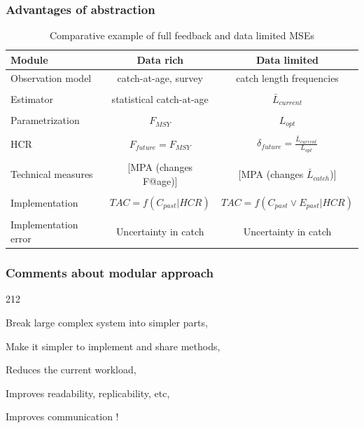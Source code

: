\documentclass{beamer}
\begin{document}
\begin{frame}
\frametitle{Advantages of abstraction}

\footnotesize

\begin{table}
	\begin{tabular}{l|c|c}
		\hline 
		Module	& Data rich & Data limited \\ 
		\hline 
		\hline 
		Observation model	&  catch-at-age, survey & catch length frequencies \\ 
    & & \\
		Estimator	& statistical catch-at-age &  $\bar{L}_{current}$ \\ 
    & & \\
		Parametrization	& $F_{MSY}$ &  $L_{opt}$ \\ 
    & & \\
		HCR	& $F_{future}=F_{MSY}$ & $\delta_{future}=\frac{\bar{L}_{current}}{L_{opt}}$ \\ 
    & & \\
		Technical measures	& [MPA (changes F@age)] & [MPA (changes $\bar{L}_{catch}$)] \\ 
    & & \\
		Implementation	& $TAC=f(C_{past}|HCR)$ & $TAC=f(C_{past} \lor E_{past}|HCR)$ \\ 
    & & \\
		Implementation error	& Uncertainty in catch & Uncertainty in catch \\ 
		\hline 
	\end{tabular} 
	
	\caption{Comparative example of full feedback and data limited MSEs}
\end{table}

\end{frame}

\begin{frame}
\frametitle{Comments about modular approach}

\Large

\begin{dinglist}{212}
  \item Break large complex system into simpler parts,
	\item Make it simpler to implement and share methods,
	\item Reduces the current workload,
	\item Improves readability, replicability, etc, 
	\item Improves communication !
\end{dinglist}

\end{frame}
\end{document}
